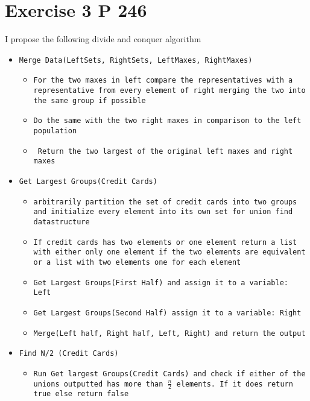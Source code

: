 \documentclass{amsart}
\begin{document}
\section{Exercise 3 P 246}
I propose the following divide and conquer algorithm
{\small
    \begin{itemize}
        \item \texttt{Merge Data(LeftSets, RightSets, LeftMaxes, RightMaxes)}
            \begin{itemize}
                \item \texttt{For the two maxes in left compare the representatives with a representative from
                    every element of right merging the two into the same group if possible}
                \item \texttt{Do the same with the two right maxes in comparison to the left population}
                \item \texttt{ Return the two largest of the original left maxes and right maxes}
            \end{itemize}
        \item \texttt{Get Largest Groups(Credit Cards)}
            \begin{itemize}
                \item \texttt{arbitrarily partition the set of credit cards into two groups and initialize every
                    element into its own set for union find datastructure}
                \item \texttt{If credit cards has two elements or one element return a list with either only one element if the two elements
                    are equivalent or a list with two elements one for each element}
                \item \texttt{Get Largest Groups(First Half) and assign it to a variable: Left}
                \item \texttt{Get Largest Groups(Second Half) assign it to a variable: Right}
                \item \texttt{Merge(Left half, Right half, Left, Right) and return the output}
            \end{itemize}
        \item \texttt{Find N/2 (Credit Cards)}
            \begin{itemize}
                \item \texttt{Run Get largest Groups(Credit Cards) and check if either of the unions outputted has
                    more than $\frac{n}{2}$ elements. If it does return true else return false}
            \end{itemize}
    \end{itemize}
}
\end{document}
